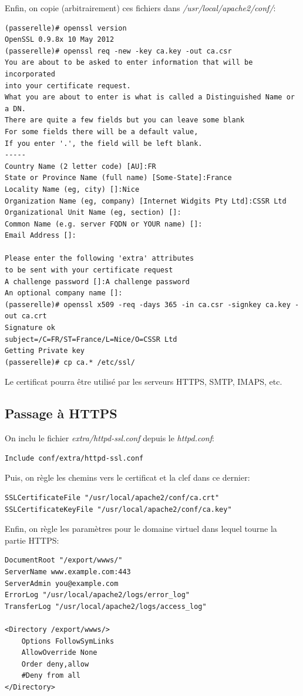 \documentclass[a4paper]{article}
\begin{document}
Enfin, on copie (arbitrairement) ces fichiers dans
\textit{/usr/local/apache2/conf/}:
\begin{verbatim}
(passerelle)# openssl version
OpenSSL 0.9.8x 10 May 2012
(passerelle)# openssl req -new -key ca.key -out ca.csr
You are about to be asked to enter information that will be incorporated
into your certificate request.
What you are about to enter is what is called a Distinguished Name or a DN.
There are quite a few fields but you can leave some blank
For some fields there will be a default value,
If you enter '.', the field will be left blank.
-----
Country Name (2 letter code) [AU]:FR
State or Province Name (full name) [Some-State]:France
Locality Name (eg, city) []:Nice
Organization Name (eg, company) [Internet Widgits Pty Ltd]:CSSR Ltd
Organizational Unit Name (eg, section) []:
Common Name (e.g. server FQDN or YOUR name) []:
Email Address []:

Please enter the following 'extra' attributes
to be sent with your certificate request
A challenge password []:A challenge password
An optional company name []:
(passerelle)# openssl x509 -req -days 365 -in ca.csr -signkey ca.key -out ca.crt
Signature ok
subject=/C=FR/ST=France/L=Nice/O=CSSR Ltd
Getting Private key
(passerelle)# cp ca.* /etc/ssl/
\end{verbatim}

Le certificat pourra être utilisé par les serveurs HTTPS, SMTP, IMAPS, etc.

\subsection{Passage à HTTPS}
On inclu le fichier \textit{extra/httpd-ssl.conf} depuis le
\textit{httpd.conf}:
\begin{verbatim}
Include conf/extra/httpd-ssl.conf
\end{verbatim}

Puis, on règle les chemins vers le certificat et la clef dans ce
dernier:
\begin{verbatim}
SSLCertificateFile "/usr/local/apache2/conf/ca.crt"
SSLCertificateKeyFile "/usr/local/apache2/conf/ca.key"
\end{verbatim}

Enfin, on règle les paramètres pour le domaine virtuel dans lequel
tourne la partie HTTPS:
\begin{verbatim}
DocumentRoot "/export/wwws/"
ServerName www.example.com:443
ServerAdmin you@example.com
ErrorLog "/usr/local/apache2/logs/error_log"
TransferLog "/usr/local/apache2/logs/access_log"

<Directory /export/wwws/>
    Options FollowSymLinks
    AllowOverride None
    Order deny,allow
    #Deny from all
</Directory>
\end{verbatim}
\end{document}
